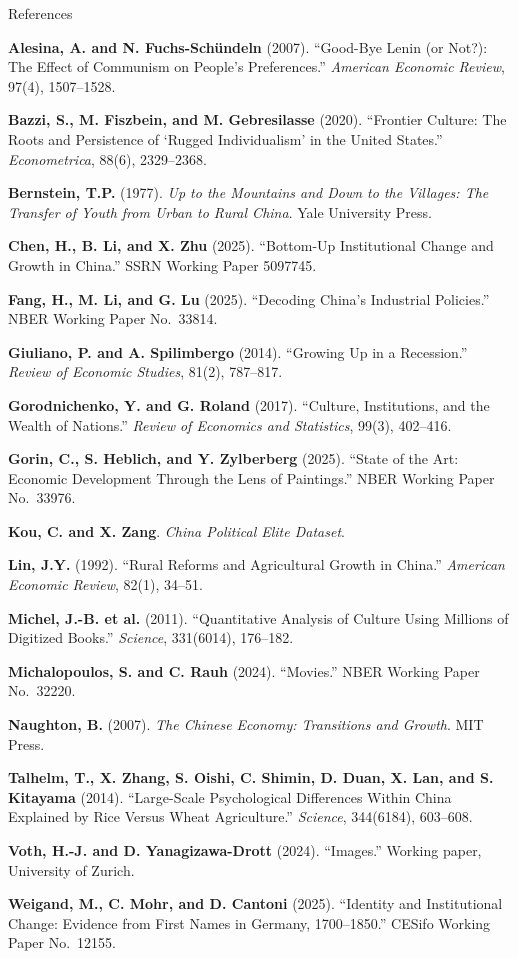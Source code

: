 \documentclass[aspectratio=169]{beamer}
\begin{document}
\begin{frame}[allowframebreaks]{References}
\tiny
\setlength{\parskip}{4pt}

\textbf{Alesina, A. and N. Fuchs-Sch\"{u}ndeln} (2007). ``Good-Bye Lenin (or Not?): The Effect of Communism on People's Preferences.'' \textit{American Economic Review}, 97(4), 1507--1528.

\textbf{Bazzi, S., M. Fiszbein, and M. Gebresilasse} (2020). ``Frontier Culture: The Roots and Persistence of `Rugged Individualism' in the United States.'' \textit{Econometrica}, 88(6), 2329--2368.

\textbf{Bernstein, T.P.} (1977). \textit{Up to the Mountains and Down to the Villages: The Transfer of Youth from Urban to Rural China}. Yale University Press.

\textbf{Chen, H., B. Li, and X. Zhu} (2025). ``Bottom-Up Institutional Change and Growth in China.'' SSRN Working Paper 5097745.

\textbf{Fang, H., M. Li, and G. Lu} (2025). ``Decoding China's Industrial Policies.'' NBER Working Paper No.\ 33814.

\textbf{Giuliano, P. and A. Spilimbergo} (2014). ``Growing Up in a Recession.'' \textit{Review of Economic Studies}, 81(2), 787--817.

\textbf{Gorodnichenko, Y. and G. Roland} (2017). ``Culture, Institutions, and the Wealth of Nations.'' \textit{Review of Economics and Statistics}, 99(3), 402--416.

\textbf{Gorin, C., S. Heblich, and Y. Zylberberg} (2025). ``State of the Art: Economic Development Through the Lens of Paintings.'' NBER Working Paper No.\ 33976.

\textbf{Kou, C. and X. Zang}. \textit{China Political Elite Dataset}.

\textbf{Lin, J.Y.} (1992). ``Rural Reforms and Agricultural Growth in China.'' \textit{American Economic Review}, 82(1), 34--51.

\textbf{Michel, J.-B. et al.} (2011). ``Quantitative Analysis of Culture Using Millions of Digitized Books.'' \textit{Science}, 331(6014), 176--182.

\textbf{Michalopoulos, S. and C. Rauh} (2024). ``Movies.'' NBER Working Paper No.\ 32220.

\textbf{Naughton, B.} (2007). \textit{The Chinese Economy: Transitions and Growth}. MIT Press.

\textbf{Talhelm, T., X. Zhang, S. Oishi, C. Shimin, D. Duan, X. Lan, and S. Kitayama} (2014). ``Large-Scale Psychological Differences Within China Explained by Rice Versus Wheat Agriculture.'' \textit{Science}, 344(6184), 603--608.

\textbf{Voth, H.-J. and D. Yanagizawa-Drott} (2024). ``Images.'' Working paper, University of Zurich.

\textbf{Weigand, M., C. Mohr, and D. Cantoni} (2025). ``Identity and Institutional Change: Evidence from First Names in Germany, 1700--1850.'' CESifo Working Paper No.\ 12155.

\end{frame}
\end{document}
